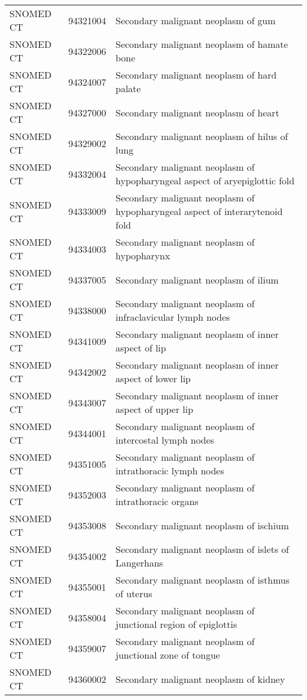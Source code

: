 \begin{longtable}{p{}p{}p{}}
  SNOMED CT & 94321004 & Secondary malignant neoplasm of gum \\ 
  SNOMED CT & 94322006 & Secondary malignant neoplasm of hamate bone \\ 
  SNOMED CT & 94324007 & Secondary malignant neoplasm of hard palate \\ 
  SNOMED CT & 94327000 & Secondary malignant neoplasm of heart \\ 
  SNOMED CT & 94329002 & Secondary malignant neoplasm of hilus of lung \\ 
  SNOMED CT & 94332004 & Secondary malignant neoplasm of hypopharyngeal aspect of aryepiglottic fold \\ 
  SNOMED CT & 94333009 & Secondary malignant neoplasm of hypopharyngeal aspect of interarytenoid fold \\ 
  SNOMED CT & 94334003 & Secondary malignant neoplasm of hypopharynx \\ 
  SNOMED CT & 94337005 & Secondary malignant neoplasm of ilium \\ 
  SNOMED CT & 94338000 & Secondary malignant neoplasm of infraclavicular lymph nodes \\ 
  SNOMED CT & 94341009 & Secondary malignant neoplasm of inner aspect of lip \\ 
  SNOMED CT & 94342002 & Secondary malignant neoplasm of inner aspect of lower lip \\ 
  SNOMED CT & 94343007 & Secondary malignant neoplasm of inner aspect of upper lip \\ 
  SNOMED CT & 94344001 & Secondary malignant neoplasm of intercostal lymph nodes \\ 
  SNOMED CT & 94351005 & Secondary malignant neoplasm of intrathoracic lymph nodes \\ 
  SNOMED CT & 94352003 & Secondary malignant neoplasm of intrathoracic organs \\ 
  SNOMED CT & 94353008 & Secondary malignant neoplasm of ischium \\ 
  SNOMED CT & 94354002 & Secondary malignant neoplasm of islets of Langerhans \\ 
  SNOMED CT & 94355001 & Secondary malignant neoplasm of isthmus of uterus \\ 
  SNOMED CT & 94358004 & Secondary malignant neoplasm of junctional region of epiglottis \\ 
  SNOMED CT & 94359007 & Secondary malignant neoplasm of junctional zone of tongue \\ 
  SNOMED CT & 94360002 & Secondary malignant neoplasm of kidney \\ 

\end{longtable}
